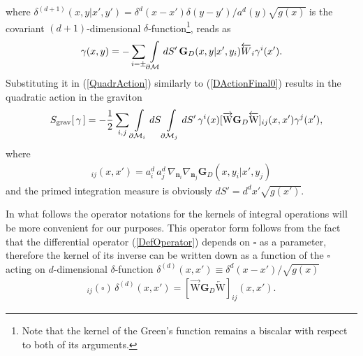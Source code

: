 \documentclass[a4paper,12pt]{article}
\newcommand{\ddim}{{d}}
\newcommand{\DDim}{{(d+\!1)}}
\newcommand{\dM}{{\partial \cal M}}
\newcommand{\un}{\mathbf n} %
\newcommand{\bBox}{\square}  %
\newcommand{\Bnabla}{\nabla}  %
\newcommand{\GrD}{ \mathbf{G}_{D}}  %
\newcommand{\nGrDn}{\overrightarrow{\mathrm{W}}\mathbf{G}_{D}\overleftarrow{\mathrm{W}}} %
\newcommand{\NGrDN}{\overrightarrow{\mathrm{W}}\mathbf{G}_{D}\overleftarrow{\mathrm{W}}} %
\newcommand{\RnGrDnR}{{\NGrDN}} %
\newcommand{\dS}{dS}
\begin{document}
where $\delta^\DDim (x,y|x',y')=
\delta^\ddim(x\!-\!x')\delta(y\!-\!y')/a^\ddim(y)\sqrt{g(x)}$ is
the covariant $\DDim$-dimensional $\delta$-function\footnote{Note
that \fi the kernel of the Green's function remains a biscalar
with respect to both of its arguments.}, reads as
    \begin{eqnarray}
     \gamma(x,y)=-\sum_{i=\pm}\int
     \limits_{\dM}\dS'\,\GrD(x,y|x',y_i)
    {\overleftarrow{W}}_i\gamma^i(x').
    \end{eqnarray}
Substituting it in (\ref{QuadrAction}) similarly to
(\ref{DActionFinal0}) results in the quadratic action in the
graviton
        \begin{eqnarray}
     &&S_{\mathrm{grav}}[\,\gamma\,]=
    -\frac12 \sum_{i,j}\int
     \limits_{\dM_i}\dS
    \int \limits_{\dM_j}\dS'\,
     \gamma^i(x)[\NGrDN]_{ij}(x,x')
     \gamma^j(x'),                             \label{DEffAction}
    \end{eqnarray}
where
    \begin{eqnarray}
    [\nGrDn]_{ij}(x,x')=
    a^\ddim_i \,a^\ddim_j\,\Bnabla_{\un_i}
    \Bnabla_{\un_j} \GrD (x,y_i|x',y_j)        \label{Dformfactor}
    \end{eqnarray}
and the primed integration measure is obviously
$\dS'=d^dx'\sqrt{g(x')}$.

In what follows the operator notations for the kernels of integral
operations will be more convenient for our purposes. This operator
form follows from the fact that the differential operator
(\ref{DefOperator}) depends on $\bBox$ as a parameter, therefore
the kernel of its inverse can be written down as a function of the
$\bBox$ acting on $\ddim$-dimensional $\delta$-function
$\delta^{(\ddim)}(x,x')\equiv\delta^\ddim(x\!-\!x')/\sqrt{g(x)}$
    \begin{eqnarray}
     [{\RnGrDnR}]_{ij}(\bBox)\,
     \delta^{(\ddim)}(x,x')
     =[{\RnGrDnR}]_{ij}(x,x').  \label{Kernel->Box}
    \end{eqnarray}
\end{document}
